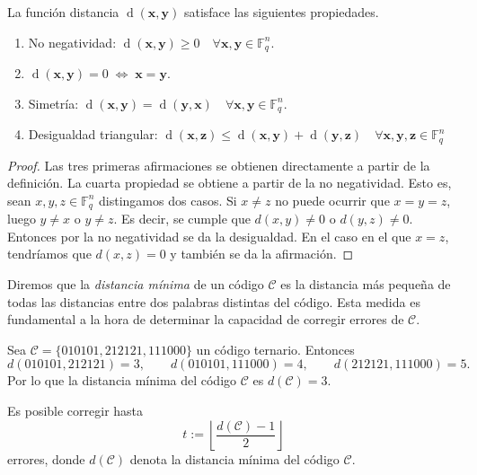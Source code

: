 \begin{theorem}
    La función distancia $\operatorname{d}(\mathbf{x},\mathbf{y})$ satisface las siguientes propiedades.

    \begin{enumerate}
        \item No negatividad: $\operatorname{d}(\mathbf{x},\mathbf{y}) \geq 0 \quad \forall \mathbf{x},\mathbf{y} \in \mathbb{F}_q^n$.
        \item $\operatorname{d}(\mathbf{x},\mathbf{y}) = 0 \; \Leftrightarrow \; \mathbf{x} = \mathbf{y}$.
        \item Simetría: $\operatorname{d}(\mathbf{x},\mathbf{y}) = \operatorname{d}(\mathbf{y},\mathbf{x}) \quad \forall \mathbf{x},\mathbf{y} \in \mathbb{F}_q^n$.
        \item Desigualdad triangular: $\operatorname{d}(\mathbf{x},\mathbf{z}) \leq \operatorname{d}(\mathbf{x},\mathbf{y}) + \operatorname{d}(\mathbf{y},\mathbf{z}) \quad \forall \mathbf{x},\mathbf{y},\mathbf{z} \in \mathbb{F}_q^n$
    \end{enumerate}
\end{theorem}

\begin{proof}
    Las tres primeras afirmaciones se obtienen directamente a partir de la definición.
    La cuarta propiedad se obtiene a partir de la no negatividad. Esto es, sean $x,y,z \in \mathbb{F}_q^n$ distingamos dos casos. Si $x \neq z$ no puede ocurrir que $x = y = z$, luego  $y \neq x$ o $y \neq z$. Es decir, se cumple que $d(x,y) \neq 0$ o $d(y, z) \neq 0$. Entonces por la no negatividad se da la desigualdad. En el caso en el que $x = z$, tendríamos que $d(x,z) = 0$ y también se da la afirmación.
\end{proof}

Diremos que la \emph{distancia mínima} de un código $\mathcal{C}$ es la distancia más pequeña de todas las distancias entre dos palabras distintas del código. Esta medida es fundamental a la hora de determinar la capacidad de corregir errores de $\mathcal{C}$.

\begin{exampleth}
    Sea $\mathcal{C} = \{010101, 212121, 111000\}$ un código ternario. Entonces
    \[
        d(010101, 212121) = 3, \qquad d(010101, 111000) = 4, \qquad d(212121, 111000) = 5.
    \]
    Por lo que la distancia mínima del código $\mathcal{C}$ es $d(\mathcal{C}) = 3$.
\end{exampleth}

\begin{theorem}
    \label{th:decodificacion_maxima_verosimilitud}
    Es posible corregir hasta
    $$t := \left\lfloor \frac{d(\mathcal{C}) - 1}{2} \right\rfloor$$
    errores, donde $d(\mathcal{C})$ denota la distancia mínima del código $\mathcal{C}$.
\end{theorem}

